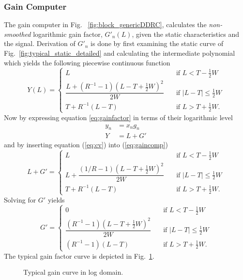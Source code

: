 \documentclass[../main2.tex]{subfiles}
\providecommand{\rootdir}{..}
\begin{document}
\subsubsection{Gain Computer} \label{gain_computer}
The gain computer in Fig. ~\ref{fig:block_genericDDRC}, calculates the \emph{non-smoothed} logarithmic gain factor, $G'_n(L)$, given the static characteristics and the signal. Derivation of $G'_n$ is done by first examining the static curve of Fig.~\ref{fig:typical_static_detailed} and calculating the intermediate polynomial which yields the following piecewise continuous function
\begin{equation} \label{eq:gaincomp}
Y(L) = \begin{cases}
    L & \quad \text{if }L<T-\frac{1}{2}W \\[0.8em]
    \dfrac{L+(R^{-1}-1)(L-T+\frac{1}{2}W)^2}{2W}& \quad \text{if } |L-T| \leq \frac{1}{2}W\\[1.2em]
    T+ R^{-1}(L-T) & \quad \text{if } L > T + \frac{1}{2}W.
\end{cases}
\end{equation}
Now  by expressing equation \eqref{eq:gainfactor} in terms of their logarithmic level
\begin{align}
y_n &= x_ng_n   \\
Y &= L + G' \label{eq:cv}
\end{align}
and by inserting equation (\ref{eq:cv}) into (\ref{eq:gaincomp})
\begin{equation}
L+G' = \begin{cases}
    L & \quad \text{if }L < T-\frac{1}{2}W \\[0.8em]
    L + \dfrac{(1/R-1)(L-T+\frac{1}{2}W)^2}{2W}& \quad \text{if } |L-T| \leq \frac{1}{2}W\\[1.2em]
    T+ R^{-1}(L-T) & \quad \text{if } L > T + \frac{1}{2}W.
\end{cases}
\end{equation}
Solving for $G'$ yields
\begin{equation} \label{eq:gain}
G' = \begin{cases}
    0 & \quad \text{if }L <T -\frac{1}{2}W \\[0.8em]
    \dfrac{(R^{-1}-1)(L-T+\frac{1}{2}W)^2}{2W}& \quad \text{if } |L-T| \leq \frac{1}{2}W\\[1.2em]
    \left(R^{-1}-1\right)\left(L-T\right) & \quad \text{if } L > T + \frac{1}{2}W.
 \end{cases}
\end{equation}
The typical gain factor curve is depicted in Fig.~\ref{fig:typical_gain_detailed}.
\begin{figure}[h]
\centerline{}
\caption{Typical gain curve in log domain.}
\label{fig:typical_gain_detailed}
\end{figure}
\end{document}
